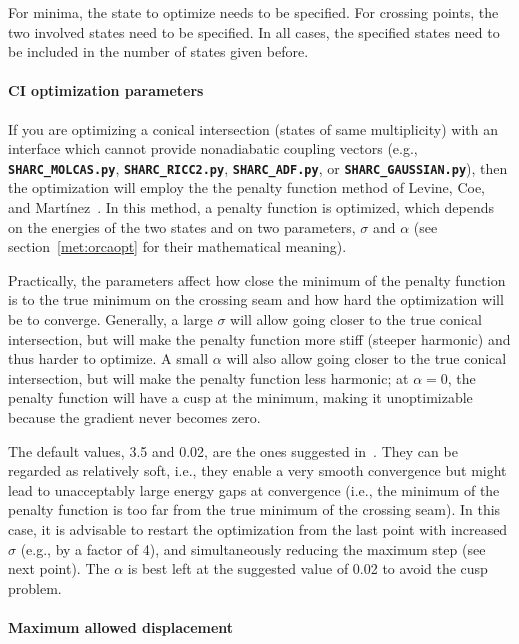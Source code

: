 \documentclass[a4paper,10pt,DIV=15,openany,twoside=false]{scrbook}
\newcommand{\ttt}[1]{\textbf{\texttt{#1}}}
\begin{document}
For minima, the state to optimize needs to be specified.
For crossing points, the two involved states need to be specified.
In all cases, the specified states need to be included in the number of states given before.

\paragraph{CI optimization parameters}

If you are optimizing a conical intersection (states of same multiplicity) with an interface which cannot provide nonadiabatic coupling vectors (e.g., \ttt{SHARC\_MOLCAS.py}, \ttt{SHARC\_RICC2.py}, \ttt{SHARC\_ADF.py}, or \ttt{SHARC\_GAUSSIAN.py}), then the optimization will employ the the penalty function method of Levine, Coe, and Mart\'inez~\cite{Levine2008JPCB}.
In this method, a penalty function is optimized, which depends on the energies of the two states and on two parameters, $\sigma$ and $\alpha$ (see section~\ref{met:orcaopt} for their mathematical meaning).

Practically, the parameters affect how close the minimum of the penalty function is to the true minimum on the crossing seam and how hard the optimization will be to converge.
Generally, a large $\sigma$ will allow going closer to the true conical intersection, but will make the penalty function more stiff (steeper harmonic) and thus harder to optimize.
A small $\alpha$ will also allow going closer to the true conical intersection, but will make the penalty function less harmonic; at $\alpha=0$, the penalty function will have a cusp at the minimum, making it unoptimizable because the gradient never becomes zero.

The default values, 3.5 and 0.02, are the ones suggested in~\cite{Levine2008JPCB}.
They can be regarded as relatively soft, i.e., they enable a very smooth convergence but might lead to unacceptably large energy gaps at convergence (i.e., the minimum of the penalty function is too far from the true minimum of the crossing seam).
In this case, it is advisable to restart the optimization from the last point with increased $\sigma$ (e.g., by a factor of 4), and simultaneously reducing the maximum step (see next point).
The $\alpha$ is best left at the suggested value of 0.02 to avoid the cusp problem.

\paragraph{Maximum allowed displacement}
\end{document}
